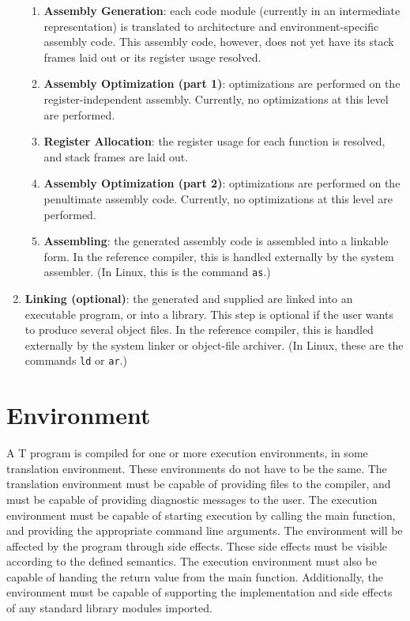 \documentclass[letterpaper,12pt]{book}
\begin{document}
\begin{enumerate}
\begin{enumerate}
		\item \textbf{Assembly Generation}: each code module (currently in an intermediate representation) is translated to architecture and environment-specific assembly code. This assembly code, however, does not yet have its stack frames laid out or its register usage resolved.
		
		\item \textbf{Assembly Optimization (part 1)}: optimizations are performed on the register-independent assembly. Currently, no optimizations at this level are performed.
		
		\item \textbf{Register Allocation}: the register usage for each function is resolved, and stack frames are laid out.
		
		\item \textbf{Assembly Optimization (part 2)}: optimizations are performed on the penultimate assembly code. Currently, no optimizations at this level are performed.
		
		\item \textbf{Assembling}: the generated assembly code is assembled into a linkable form. In the reference compiler, this is handled externally by the system assembler. (In Linux, this is the command \texttt{as}.)
	\end{enumerate}
	
	\item \textbf{Linking (optional)}: the generated and supplied are linked into an executable program, or into a library. This step is optional if the user wants to produce several object files. In the reference compiler, this is handled externally by the system linker or object-file archiver. (In Linux, these are the commands \texttt{ld} or \texttt{ar}.)
\end{enumerate}

\section{Environment}

A T program is compiled for one or more execution environments, in some translation environment. These environments do not have to be the same. The translation environment must be capable of providing files to the compiler, and must be capable of providing diagnostic messages to the user. The execution environment must be capable of starting execution by calling the main function, and providing the appropriate command line arguments. The environment will be affected by the program through side effects. These side effects must be visible according to the defined semantics. The execution environment must also be capable of handing the return value from the main function. Additionally, the environment must be capable of supporting the implementation and side effects of any standard library modules imported.
\end{document}

